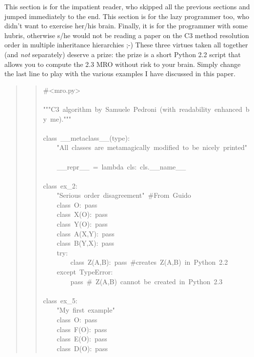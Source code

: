 \documentclass[10pt,a4paper,english]{article}
\begin{document}
This section is for the impatient reader, who skipped all the previous
sections and jumped immediately to the end.  This section is for the
lazy programmer too, who didn't want to exercise her/his brain.
Finally, it is for the programmer with some hubris, otherwise s/he would
not be reading a paper on the C3 method resolution order in multiple
inheritance hierarchies ;-) These three virtues taken all together (and
\emph{not} separately) deserve a prize:  the prize is a short Python 2.2
script that allows you to compute the 2.3 MRO without risk to your
brain.  Simply change the last line to play with the various examples I
have discussed in this paper.
\begin{quote}
\begin{quote}{\ttfamily \raggedright \noindent
{\#}<mro.py>~\\
~\\
"{}"{}"C3~algorithm~by~Samuele~Pedroni~(with~readability~enhanced~by~me)."{}"{}"~\\
~\\
class~{\_}{\_}metaclass{\_}{\_}(type):~\\
~~~~"All~classes~are~metamagically~modified~to~be~nicely~printed"~\\
~~~~{\_}{\_}repr{\_}{\_}~=~lambda~cls:~cls.{\_}{\_}name{\_}{\_}~\\
~\\
class~ex{\_}2:~\\
~~~~"Serious~order~disagreement"~{\#}From~Guido~\\
~~~~class~O:~pass~\\
~~~~class~X(O):~pass~\\
~~~~class~Y(O):~pass~\\
~~~~class~A(X,Y):~pass~\\
~~~~class~B(Y,X):~pass~\\
~~~~try:~\\
~~~~~~~~class~Z(A,B):~pass~{\#}creates~Z(A,B)~in~Python~2.2~\\
~~~~except~TypeError:~\\
~~~~~~~~pass~{\#}~Z(A,B)~cannot~be~created~in~Python~2.3~\\
~\\
class~ex{\_}5:~\\
~~~~"My~first~example"~\\
~~~~class~O:~pass~\\
~~~~class~F(O):~pass~\\
~~~~class~E(O):~pass~\\
~~~~class~D(O):~pass~\\
}
\end{quote}
\end{quote}
\end{document}
